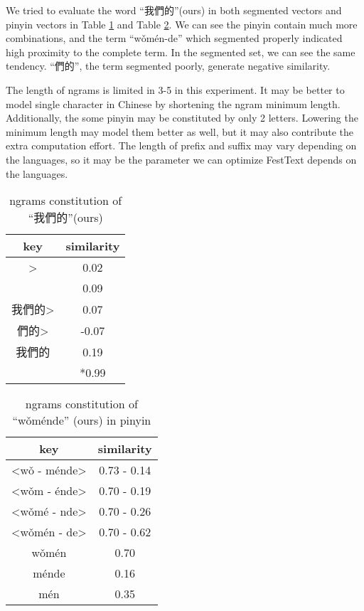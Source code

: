 We tried to evaluate the word \enquote{我們的}(ours) in both segmented vectors and pinyin vectors in Table \ref{table:ngrams-seg} and Table \ref{table:ngrams-pinyin}. 
We can see the pinyin contain much more combinations, and the term \enquote{wǒmén-de} which segmented properly indicated high proximity to the complete term. 
In the segmented set, we can see the same tendency. \enquote{們的}, the term segmented poorly, generate negative similarity. 

The length of ngrams is limited in 3-5 in this experiment. It may be better to model single character in Chinese by shortening the ngram minimum length.
Additionally, the some pinyin may be constituted by only 2 letters.  Lowering the minimum length may model them better as well, but it may also contribute the extra computation effort.
The length of prefix and suffix may vary depending on the languages, so it may be the parameter we can optimize FestText depends on the languages.

\begin{table}[]
\centering
\caption{ngrams constitution of \enquote{我們的}(ours)}
\label{table:ngrams-seg}
\begin{tabular}{|c|c|}
\hline
 key  &  similarity \\
\hline
{}\textgreater     &  0.02 \\
     &  0.09 \\
我們的\textgreater     &  0.07 \\
們的\textgreater     &  -0.07 \\
我們的     & 0.19   \\
     &  *0.99   \\   
\hline
\end{tabular}
\end{table}

\begin{table}[]
\centering
\caption{ngrams constitution of \enquote{wǒménde} (ours) in pinyin}
\label{table:ngrams-pinyin}
\begin{tabular}{|c|c|}
\hline
 key  &  similarity \\
\hline
\textless wǒ -  ménde\textgreater      &  0.73 - 0.14 \\
\textless wǒm -  énde\textgreater      &  0.70 - 0.19 \\
\textless wǒmé - nde\textgreater     &  0.70 - 0.26 \\
\textless wǒmén - de\textgreater      &  0.70 - 0.62\\
wǒmén      &  0.70 \\
  ménde     & 0.16   \\
mén     &  0.35   \\   
\hline
\end{tabular}
\end{table}

